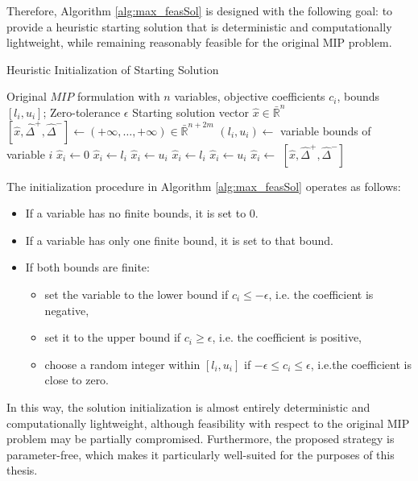 Therefore, Algorithm \ref{alg:max_feasSol} is designed with the following goal: to provide a heuristic starting solution that is deterministic and computationally lightweight, while remaining reasonably feasible for the original MIP problem.  
\begin{algorithm}[H]
\caption{Heuristic Initialization of Starting Solution}\label{alg:max_feasSol}
\begin{algorithmic}[1]
\Require Original $MIP$ formulation with $n$ variables, objective coefficients $c_i$, bounds $[l_i, u_i]$; Zero-tolerance $\epsilon$
\Ensure Starting solution vector $\hat{x} \in \bar{\mathbb{R}}^n$
    \State $[\hat{x},\hat\Delta^+,\hat\Delta^-] \gets ( +\infty, \ldots, +\infty ) \in \bar{\mathbb{R}}^{n+2m}$
        \State $(l_i, u_i) \gets$ variable bounds of variable $i$
            \State $\hat{x}_i \gets 0$
            \State $\hat{x}_i \gets l_i$
            \State $\hat{x}_i \gets u_i$
        \Else
                \State $\hat{x}_i \gets l_i$
                \State $\hat{x}_i \gets u_i$
            \Else
                \State $\hat{x}_i \gets$ 
            \EndIf
        \EndIf
    \EndFor
    \State \Return $[\hat{x},\hat\Delta^+,\hat\Delta^-]$
\EndFunction
\end{algorithmic}
\end{algorithm}
The initialization procedure in Algorithm \ref{alg:max_feasSol} operates as follows:
\begin{itemize}
    \item If a variable has no finite bounds, it is set to $0$.
    \item If a variable has only one finite bound, it is set to that bound.
    \item If both bounds are finite:
    \begin{itemize}
        \item set the variable to the lower bound if $c_i \leq -\epsilon$, i.e. the coefficient is negative,
        \item set it to the upper bound if $c_i \geq \epsilon$, i.e. the coefficient is positive,
        \item choose a random integer within $[l_i, u_i]$ if $-\epsilon \leq c_i \leq \epsilon$, i.e.the coefficient is close to zero.
    \end{itemize}
\end{itemize}
In this way, the solution initialization is almost entirely deterministic and computationally lightweight, although feasibility with respect to the original MIP problem may be partially compromised. Furthermore, the proposed strategy is parameter-free, which makes it particularly well-suited for the purposes of this thesis.

